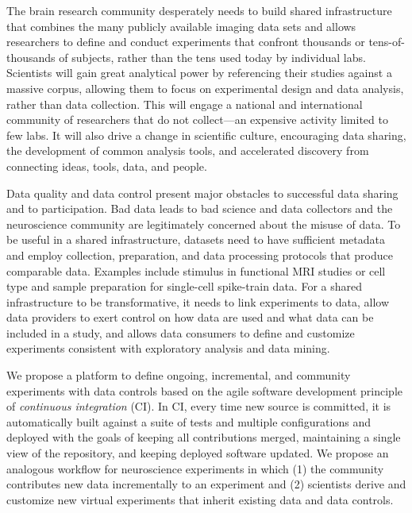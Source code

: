 
\noindent The brain research community desperately needs to build shared infrastructure that combines the many publicly available imaging data sets and allows researchers to define and conduct experiments that confront thousands or tens-of-thousands of subjects, rather than the tens used today by individual labs. Scientists will gain great analytical power by referencing their studies against a massive corpus, allowing them to focus on experimental design and data analysis, rather than data collection. This will engage a national and international community of researchers that do not collect---an expensive activity limited to few labs. It will also drive a change in scientific culture, encouraging data sharing, the development of common analysis tools, and accelerated discovery from connecting ideas, tools, data, and people.

Data quality and data control present major obstacles to successful data sharing and to participation. Bad data leads to bad science and data collectors and the neuroscience community are legitimately concerned about the misuse of data. To be useful in a shared infrastructure, datasets need to have sufficient metadata and employ collection, preparation, and data processing protocols that produce comparable data. Examples include stimulus in functional MRI studies or cell type and sample preparation for single-cell spike-train data. For a shared infrastructure to be transformative, it needs to link experiments to data, allow data providers to exert control on how data are used and what data can be included in a study, and allows data consumers to define and customize experiments consistent with exploratory analysis and data mining.

We propose a platform to define ongoing, incremental, and community experiments with data controls based on the agile software development principle of {\em continuous integration} (CI). In CI, every time new source is committed, it is automatically built against a suite of tests and multiple configurations and deployed with the goals of keeping all contributions merged, maintaining a single view of the repository, and keeping deployed software updated. We propose an analogous workflow for neuroscience experiments in which (1) the community contributes new data incrementally to an experiment and (2) scientists derive and customize new virtual experiments that inherit existing data and data controls. 


